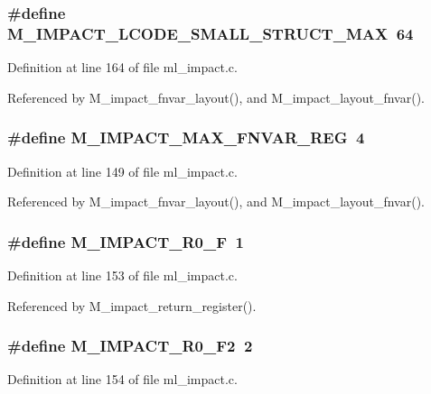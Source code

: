 \subsubsection{\setlength{\rightskip}{0pt plus 5cm}\#define M\_\-IMPACT\_\-LCODE\_\-SMALL\_\-STRUCT\_\-MAX~64}\label{ml__impact_8c_56901842c88992968d52e4e5c71e2ff4}




Definition at line 164 of file ml\_\-impact.c.

Referenced by M\_\-impact\_\-fnvar\_\-layout(), and M\_\-impact\_\-layout\_\-fnvar().
\subsubsection{\setlength{\rightskip}{0pt plus 5cm}\#define M\_\-IMPACT\_\-MAX\_\-FNVAR\_\-REG~4}\label{ml__impact_8c_a86c3b3e32f30e13621ca30b97b38109}




Definition at line 149 of file ml\_\-impact.c.

Referenced by M\_\-impact\_\-fnvar\_\-layout(), and M\_\-impact\_\-layout\_\-fnvar().
\subsubsection{\setlength{\rightskip}{0pt plus 5cm}\#define M\_\-IMPACT\_\-R0\_\-F~1}\label{ml__impact_8c_59bfd543741fd0d77c3eb3648ec616c8}




Definition at line 153 of file ml\_\-impact.c.

Referenced by M\_\-impact\_\-return\_\-register().
\subsubsection{\setlength{\rightskip}{0pt plus 5cm}\#define M\_\-IMPACT\_\-R0\_\-F2~2}\label{ml__impact_8c_e194e4bb89be2570967d770cc738ddd5}




Definition at line 154 of file ml\_\-impact.c.

